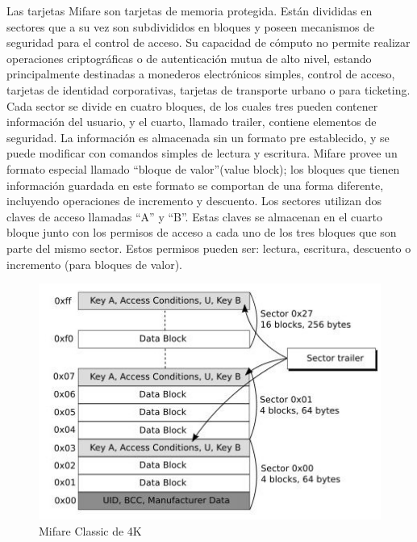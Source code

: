 Las tarjetas Mifare son tarjetas de memoria protegida. Están divididas en sectores que a su vez son subdivididos en bloques y poseen mecanismos de seguridad para el control de acceso. Su capacidad de cómputo no permite realizar operaciones criptográficas o de autenticación mutua de alto nivel, estando principalmente destinadas a monederos electrónicos simples, control de acceso, tarjetas de identidad corporativas, tarjetas de transporte urbano o para ticketing.
Cada sector se divide en cuatro bloques, de los cuales tres pueden contener información del usuario, y el cuarto, llamado trailer, contiene elementos de seguridad. La información es almacenada sin un  formato pre establecido, y se puede modificar con comandos simples de lectura y escritura. Mifare provee un formato especial llamado “bloque de valor”(value block); los bloques que tienen información guardada en este formato se comportan de una forma diferente, incluyendo operaciones de incremento y descuento.
Los sectores utilizan dos claves de acceso llamadas “A” y “B”. Estas claves se almacenan en el cuarto bloque junto con los permisos de acceso a cada uno de los tres bloques que son parte del mismo sector. Estos permisos pueden ser: lectura, escritura, descuento o incremento (para bloques de valor).

\begin{figure}[H]
\centering
  \begin{center}
  \includegraphics[scale=.6]{Imagenes/sc3.jpg} 
  \end{center}
  \caption{Mifare Classic de 4K}\label{Fig:MC_4K} 
\end{figure}


